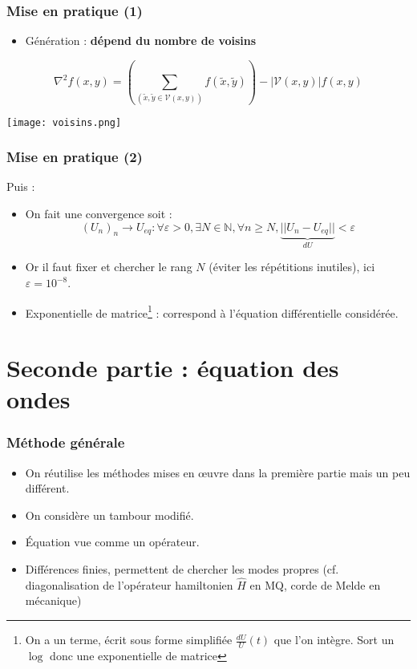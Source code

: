 \documentclass[11pt]{beamer}
\begin{document}
	\begin{frame}
		\frametitle{Mise en pratique (1)}
		\begin{itemize}
			\item Génération : \textbf{dépend du nombre de voisins} 
		\end{itemize}
		\[\nabla^2 f(x,y)=\left(\sum_{(\tilde{x},\tilde{y}\in\mathcal{V}(x,y))} f(\tilde{x},\tilde{y})\right)-|\mathcal{V}(x,y)|f(x,y)\]
		\begin{center}
			\texttt{[image: voisins.png]}
		\end{center}
	\end{frame}
	\begin{frame}
		\frametitle{Mise en pratique (2)}
		Puis :
		\begin{itemize}
			\item On fait une convergence soit :
			\[(U_n)_n\to U_{eq} : \forall\varepsilon>0, \exists N\in\mathbb{N}, \forall n\geq N, \underset{dU}{\underbrace{||U_n-U_{eq}||}}<\varepsilon\]
			\item Or il faut fixer et chercher le rang $N$ (éviter les répétitions inutiles), ici $\varepsilon=10^{-8}$.
			\item Exponentielle de matrice\footnote{On a un terme, écrit sous forme simplifiée $\frac{dU}{U}(t)$ que l'on intègre. Sort un $\log$ donc une exponentielle de matrice} : correspond à l'équation différentielle considérée.
		\end{itemize}
\end{frame}

	\section{Seconde partie : équation des ondes}

	\begin{frame}
		\tableofcontents[currentsection]
	\end{frame}

	\begin{frame}
		\frametitle{Méthode générale}
		\begin{itemize}
			\item On réutilise les méthodes mises en \oe uvre dans la première partie mais un peu différent.
			\item On considère un tambour modifié. 
			\item Équation vue comme un opérateur.
			\item Différences finies, permettent de chercher les modes propres (cf. diagonalisation de l'opérateur hamiltonien $\hat{H}$ en MQ, corde de Melde en mécanique)
		\end{itemize}	
	\end{frame}
\end{document}
